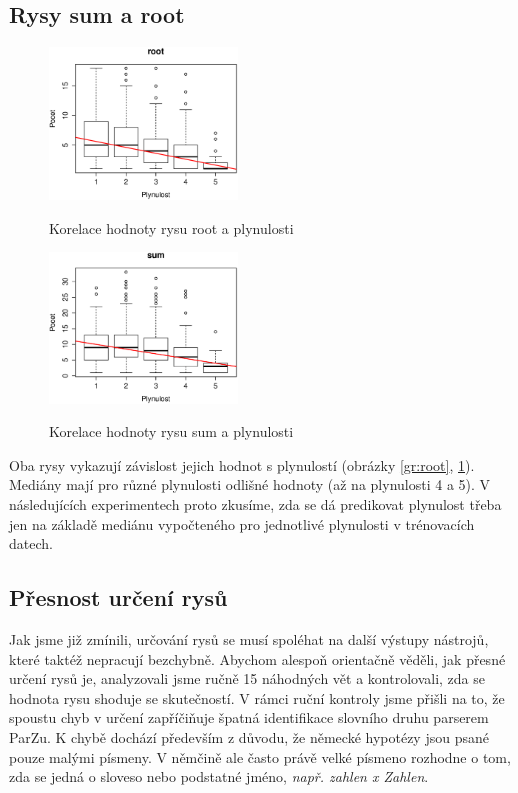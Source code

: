 \documentclass[12pt,a4paper]{report}
\begin{document}
\subsection{Rysy sum a root}
\begin{figure}[!htb]
\begin{center}
  \centering\includegraphics[width=50mm]{./grafy/rysy/root.eps}
  \caption{Korelace hodnoty rysu root a plynulosti}\label{gr:root}
\endminipage\quad
{}
  \centering\includegraphics[width=50mm]{./grafy/rysy/sum.eps}
  \caption{Korelace hodnoty rysu sum a plynulosti}\label{gr:sum}
\endminipage
\end{center}
\end{figure}

Oba rysy vykazují závislost jejich hodnot s plynulostí (obrázky \ref{gr:root}, \ref{gr:sum}). Mediány mají pro různé plynulosti odlišné hodnoty (až na plynulosti 4 a 5). V následujících experimentech proto zkusíme, zda se dá predikovat plynulost třeba jen na základě mediánu vypočteného pro jednotlivé plynulosti v trénovacích datech.


\subsection{Přesnost určení rysů}
Jak jsme již zmínili, určování rysů se musí spoléhat na další výstupy nástrojů, které taktéž nepracují bezchybně. Abychom alespoň orientačně věděli, jak přesné určení rysů je, analyzovali jsme ručně 15 náhodných vět a kontrolovali, zda se hodnota rysu shoduje se skutečností. V rámci ruční kontroly jsme přišli na to, že spoustu chyb v určení zapříčiňuje špatná identifikace slovního druhu parserem ParZu. K chybě dochází především z důvodu, že německé hypotézy jsou psané pouze malými písmeny. V němčině ale často právě velké písmeno rozhodne o tom, zda se jedná o sloveso nebo podstatné jméno, \textit{např. zahlen x Zahlen}.
\end{document}
